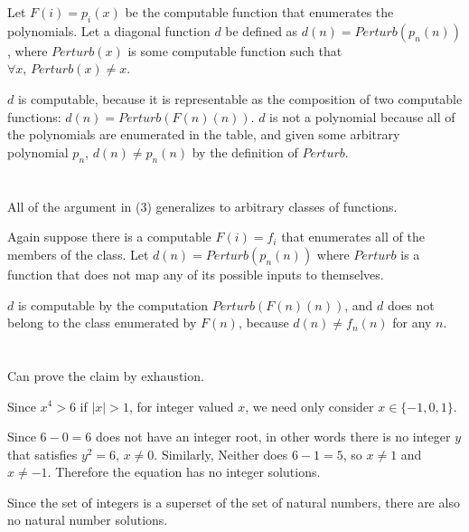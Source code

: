 \documentclass{article}
\begin{document}
Let $F(i) = p_i(x)$ be the computable function that enumerates the polynomials.
Let a diagonal function $d$ be defined as $d(n) = Perturb(p_n(n))$, where
$Perturb(x)$ is some computable function such that 
$\forall x, \hspace{2pt} Perturb(x) \ne x$.

\vspace{1em}

$d$ is computable, because it is representable as the composition of two
computable functions:
$d(n) = Perturb(F(n)(n))$. $d$ is not a polynomial because all of the
polynomials
are enumerated in the table, and given some arbitrary
polynomial $p_n$, $d(n) \ne p_n(n)$ by the definition of $Perturb$.

\section{}
All of the argument in (3) generalizes to arbitrary classes of functions.

Again suppose there is a computable $F(i) = f_i$ that enumerates all of the
members of the class. Let $d(n) = Perturb(p_n(n))$ where $Perturb$ is a
function that does not map any of its possible inputs to themselves.

$d$ is computable by the computation $Perturb(F(n)(n))$, and $d$ does not
belong to the class enumerated by $F(n)$, because $d(n) \ne f_n(n)$ for any $n$.

\section{}
Can prove the claim by exhaustion.

\vspace{1em}

Since $x^4 > 6$ if $|x| > 1$, for integer valued $x$,
we need only consider $x \in \{-1,0,1\}$.

\vspace{1em}

Since $6 -0 = 6$ does not have an integer root, in other words there is no 
integer $y$ that satisfies $y^2 = 6$, $x \ne 0$. Similarly, Neither does
$6 - 1 = 5$, so
$x \ne 1$ and $x \ne -1$. Therefore the equation has no integer solutions.

\vspace{1em}

Since
the set of integers is a superset of the set of natural numbers, there are also
no natural number solutions.
\end{document}
